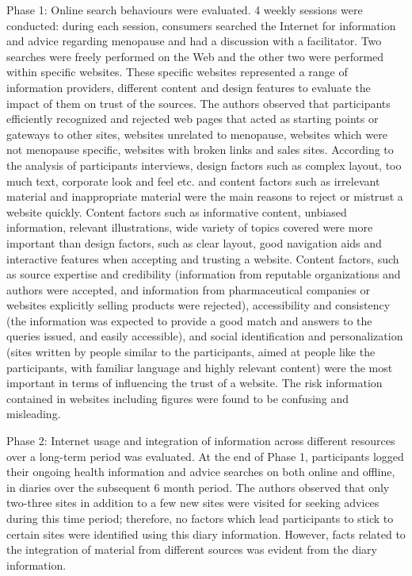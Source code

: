 \documentclass[]{article}
\begin{document}
Phase 1: Online search behaviours were evaluated. 4 weekly sessions were conducted: during each session, consumers searched the Internet for information and advice regarding menopause and had a discussion with a facilitator. Two searches were freely performed on the Web and the other two were performed within specific websites. These specific websites represented a range of information providers, different content and design features to evaluate the impact of them on trust of the sources. The authors observed that participants efficiently recognized and rejected web pages that acted as starting points or gateways to other sites, websites unrelated to menopause, websites which were not menopause specific, websites with broken links and sales sites. According to the analysis of participants interviews, design factors such as complex layout, too much text, corporate look and feel etc. and content factors such as irrelevant material and inappropriate material were the main reasons to reject or mistrust a website quickly. Content factors such as informative content, unbiased information, relevant illustrations, wide variety of topics covered were more important than design factors, such as clear layout, good navigation aids and interactive features when accepting and trusting a website. Content factors, such as source expertise and credibility (information from reputable organizations and authors were accepted, and information from pharmaceutical companies or websites explicitly selling products were rejected), accessibility and consistency (the information was expected to provide a good match and answers to the queries issued, and easily accessible), and social identification and personalization (sites written by people similar to the participants, aimed at people like the participants, with familiar language and highly relevant content) were the most important in terms of influencing the trust of a website. The risk information contained in websites including figures were found to be confusing and misleading. 

Phase 2: Internet usage and integration of information across different resources over a long-term period was evaluated. At the end of Phase 1, participants logged their ongoing health information and advice searches on both online and offline, in diaries over the subsequent 6 month period. The authors observed that only two-three sites in addition to a few new sites were visited for seeking advices during this time period; therefore, no factors which lead participants to stick to certain sites were identified using this diary information. However, facts related to the integration of material from different sources was evident from the diary information.   
\end{document}
